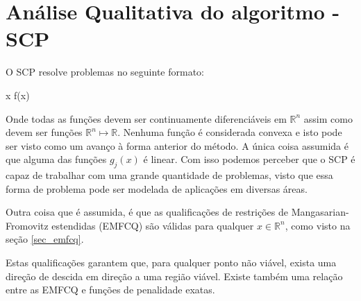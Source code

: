 \section{Análise Qualitativa do algoritmo - SCP}


O SCP resolve problemas no seguinte formato:

\vspace{-15pt}
\begin{mini!}
{x}{ f(x) \label{scp_obj}}{\label{prob_scp}}{}
\end{mini!}

Onde todas as funções devem ser continuamente diferenciáveis em \(\mathbb{R}^n\) assim como
devem ser funções \( \mathbb{R}^n \mapsto \mathbb{R} \). Nenhuma função é considerada convexa e isto
pode ser visto como um avanço à forma anterior do método. A única coisa assumida é que alguma das
funções \( g_j(x) \) é linear. Com isso podemos perceber que o SCP é capaz de trabalhar com uma
grande quantidade de problemas, visto que essa forma de problema pode ser modelada de aplicações
em diversas áreas.

Outra coisa que é assumida, é que as qualificações de restrições de Mangasarian-Fromovitz estendidas (EMFCQ)
\cite{di1994exact} são válidas para qualquer \( x \in \mathbb{R}^n \), como visto na seção \ref{sec_emfcq}.

%
Estas qualificações garantem que, para qualquer ponto não viável, exista uma
direção de descida em direção a uma região viável. Existe também uma relação entre as EMFCQ
e funções de penalidade exatas.


